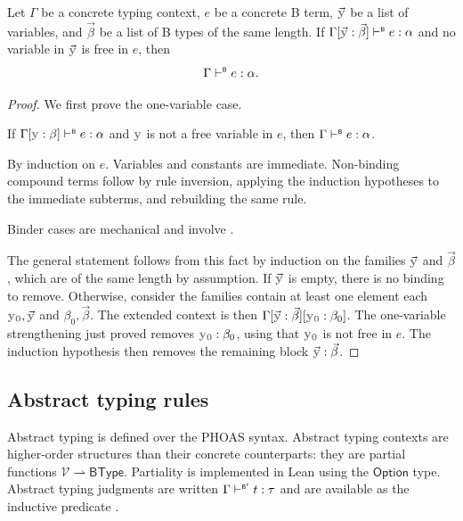 \begin{theorem}
  Let \(\Gamma\) be a concrete typing context, \(e\) be a concrete B term, \(\vec{\var{y}}\) be a list of variables, and \(\vec\beta\) be a list of B types of the same length. If \(\btype{\Gamma[\vec{\var{y}}:\vec\beta]}{e}{\alpha}\) and no variable in \(\vec{\var{y}}\) is free in \(e\), then
  \[
    \Gamma \vdash^{\scriptscriptstyle{\mathsf{B}}} e : \alpha.
  \]
\end{theorem}
\begin{proof}
  We first prove the one-variable case.
  \begin{fact}
    If \(\btype{\Gamma[\var{y}:\beta]}{e}{\alpha}\) and \(\var{y}\) is not a free variable in \(e\), then \(\Gamma \vdash^{\scriptscriptstyle{\mathsf{B}}} e : \alpha\).
  \end{fact}
  \begin{subproof}
    By induction on \(e\). Variables and constants are immediate. Non-binding compound terms follow by rule inversion, applying the induction hypotheses to the immediate subterms, and rebuilding the same rule.

    Binder cases are mechanical and involve {\small{}}.
  \end{subproof}

  The general statement follows from this fact by induction on the families \(\vec{\var{y}}\) and \(\vec\beta\), which are of the same length by assumption.
  If \(\vec{\var{y}}\) is empty, there is no binding to remove. Otherwise, consider the families contain at least one element each \(\var{y_0},\vec{\var{y}}\) and \(\beta_0,\vec\beta\).
  The extended context is then \(\Gamma[\vec{\var{y}}:\vec\beta][\var{y_0}:\beta_0]\).
  The one-variable strengthening just proved removes \(\var{y_0}:\beta_0\), using that \(\var{y_0}\) is not free in \(e\).
  The induction hypothesis then removes the remaining block \(\vec{\var{y}}:\vec\beta\).
\end{proof}

\subsection{Abstract typing rules}
\label{subsec:b-abstract-typing}

Abstract typing is defined over the PHOAS syntax.
Abstract typing contexts are higher-order structures than their concrete counterparts:
they are partial functions \(\mathcal V \rightharpoonup \mathsf{BType}\). Partiality is
implemented in Lean using the \(\mathsf{Option}\) type.
Abstract typing judgments are written \(\Gamma \vdash^{\scriptscriptstyle{\mathsf{B'}}} t : \tau\) and are available as the
inductive predicate {\small{}}.

